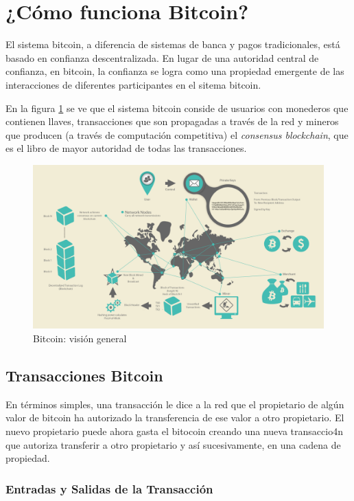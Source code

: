\documentclass[10pt,journal,compsoc]{IEEEtran}
\begin{document}
\section{¿Cómo funciona Bitcoin?}
El sistema bitcoin, a diferencia de sistemas de banca y pagos tradicionales, está basado en confianza descentralizada. En lugar de una autoridad central de confianza, en bitcoin, la confianza se logra como una propiedad emergente de las interacciones de diferentes participantes en el sitema bitcoin. 

En la figura \ref{fig:bitcoin-overview} se ve que el sistema bitcoin conside de usuarios con monederos que contienen llaves, transacciones que son propagadas a través de la red y mineros que producen (a través de computación competitiva) el \emph{consensus blockchain}, que es el libro de mayor autoridad de todas las transacciones. 

\begin{figure}[h]
    \center
    \includegraphics[width=15cm]{bitcoin-overview}
    \caption{Bitcoin: visión general}
    \label{fig:bitcoin-overview}
\end{figure}

\subsection{Transacciones Bitcoin}
En términos simples, una transacción le dice a la red que el propietario de algún valor de bitcoin ha autorizado la transferencia de ese valor a otro propietario. El nuevo propietario puede ahora gasta el bitocoin creando una nueva transaccio4n que autoriza transferir a otro propietario y así sucesivamente, en una cadena de propiedad.

\subsubsection{Entradas y Salidas de la Transacción}
\end{document}
